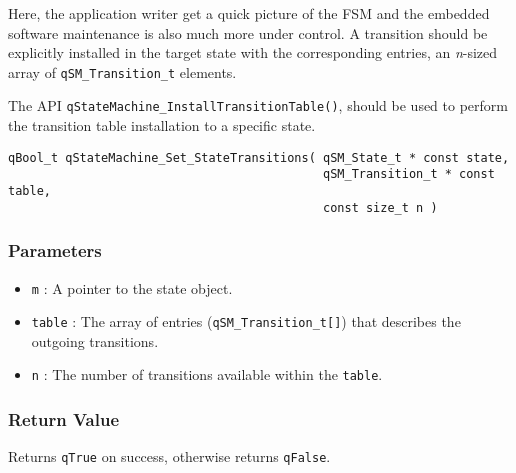 Here, the application writer get a quick picture of the FSM and the embedded software maintenance is also much more under control. A transition should be explicitly installed in the target state with the corresponding entries, an \textit{n}-sized array of \lstinline{qSM_Transition_t} elements. 

The API \lstinline{qStateMachine_InstallTransitionTable()}, should be used to perform the transition table installation to a specific state.
\medskip

\begin{lstlisting}[style=CStyle]
qBool_t qStateMachine_Set_StateTransitions( qSM_State_t * const state,
                                            qSM_Transition_t * const table,
                                            const size_t n )
\end{lstlisting} 

\subsubsection*{Parameters}
\begin{itemize}
    \item \lstinline{m} : A pointer to the state object. 
    \item \lstinline{table} : The array of entries (\lstinline{qSM_Transition_t[]}) that describes the outgoing transitions. 
    \item \lstinline{n} : The number of transitions available within the \lstinline{table}.
\end{itemize}

\subsubsection*{Return Value}
Returns \lstinline{qTrue} on success, otherwise returns \lstinline{qFalse}.

\hrulefill

